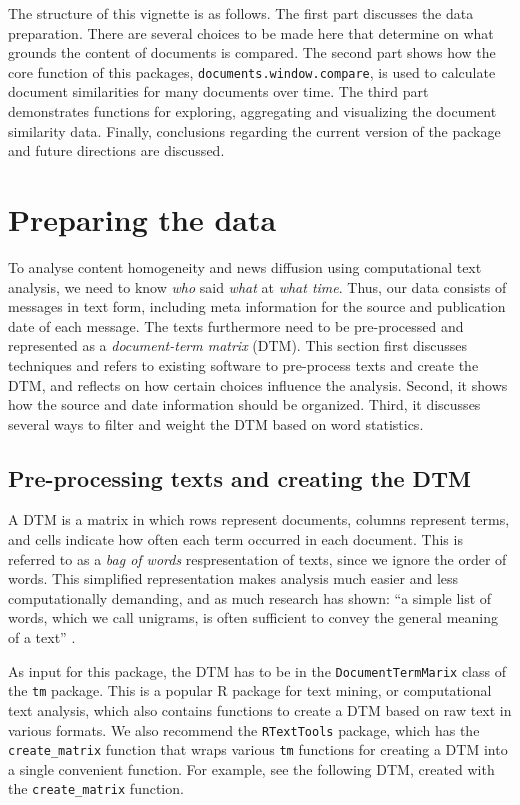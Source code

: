 The structure of this vignette is as follows. The first part discusses
the data preparation. There are several choices to be made here that
determine on what grounds the content of documents is compared. The
second part shows how the core function of this packages,
\texttt{documents.window.compare}, is used to calculate document
similarities for many documents over time. The third part demonstrates
functions for exploring, aggregating and visualizing the document
similarity data. Finally, conclusions regarding the current version of
the package and future directions are discussed.

\section{Preparing the data}\label{preparing-the-data}

To analyse content homogeneity and news diffusion using computational
text analysis, we need to know \emph{who} said \emph{what} at \emph{what
time}. Thus, our data consists of messages in text form, including meta
information for the source and publication date of each message. The
texts furthermore need to be pre-processed and represented as a
\emph{document-term matrix} (DTM). This section first discusses
techniques and refers to existing software to pre-process texts and
create the DTM, and reflects on how certain choices influence the
analysis. Second, it shows how the source and date information should be
organized. Third, it discusses several ways to filter and weight the DTM
based on word statistics.

\subsection{Pre-processing texts and creating the
DTM}\label{pre-processing-texts-and-creating-the-dtm}

A DTM is a matrix in which rows represent documents, columns represent
terms, and cells indicate how often each term occurred in each document.
This is referred to as a \emph{bag of words} respresentation of texts,
since we ignore the order of words. This simplified representation makes
analysis much easier and less computationally demanding, and as much
research has shown: ``a simple list of words, which we call unigrams, is
often sufficient to convey the general meaning of a text''
\citep[6]{grimmer13}.

As input for this package, the DTM has to be in the
\texttt{DocumentTermMarix} class of the \texttt{tm} package. This is a
popular R package for text mining, or computational text analysis, which
also contains functions to create a DTM based on raw text in various
formats. We also recommend the \texttt{RTextTools} package, which has
the \texttt{create\_matrix} function that wraps various \texttt{tm}
functions for creating a DTM into a single convenient function. For
example, see the following DTM, created with the \texttt{create\_matrix}
function.

